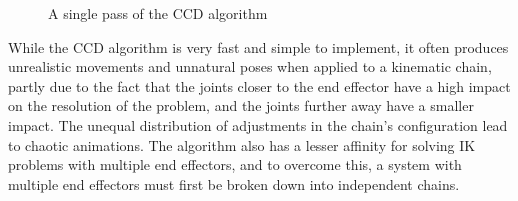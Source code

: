 \begin{figure}
    \centering
    \captionsetup{justification=centering}
    \caption{A single pass of the CCD algorithm}
    \label{fig:ccd}
\end{figure}

While the CCD algorithm is very fast and simple to implement, it often produces
unrealistic movements and unnatural poses when applied to a kinematic chain,
partly due to the fact that the joints closer to the end effector have a high
impact on the resolution of the problem, and the joints further away have
a smaller impact. The unequal distribution of adjustments in the chain's
configuration lead to chaotic animations. The algorithm also has a lesser
affinity for solving IK problems with multiple end effectors, and to overcome
this, a system with multiple end effectors must first be broken down into
independent chains. \\

